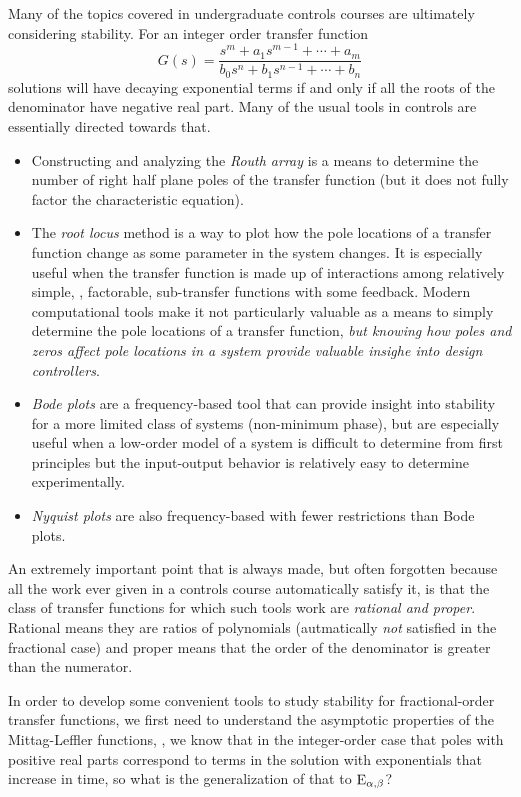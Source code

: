 Many of the topics covered in undergraduate controls courses are ultimately considering stability. For an integer order transfer function
\begin{equation*}
  G(s) = \frac{s^m + a_1 s^{m-1} + \cdots + a_m}{b_0 s^n + b_1 s^{n-1} + \cdots + b_n}
\end{equation*}
solutions will have decaying exponential terms if and only if all the roots of the denominator have negative real part. Many of the usual tools in controls are essentially directed towards that. 
\begin{itemize}
  \item Constructing and analyzing the \emph{Routh array} is a means to determine the number of right half plane poles of the transfer function (but it does not fully factor the characteristic equation).
  \item The \emph{root locus} method is a way to plot how the pole locations of a transfer function change as some parameter in the system changes. It is especially useful when the transfer function is made up of interactions among relatively simple, \ie, factorable, sub-transfer functions with some feedback. Modern computational tools make it not particularly valuable as a means to simply determine the pole locations of a transfer function, \emph{but knowing how poles and zeros affect pole locations in a system provide valuable insighe into design controllers}.
  \item \emph{Bode plots} are a frequency-based tool that can provide insight into stability for a more limited class of systems (non-minimum phase), but are especially useful when a low-order model of a system is difficult to determine from first principles but the input-output behavior is relatively easy to determine experimentally.
  \item \emph{Nyquist plots} are also frequency-based with fewer restrictions than Bode plots.
\end{itemize}
An extremely important point that is always made, but often forgotten because all the work ever given in a controls course automatically satisfy it, is that the class of transfer functions for which such tools work are \emph{rational and proper}. Rational means they are ratios of polynomials (autmatically \emph{not} satisfied in the fractional case) and proper means that the order of the denominator is greater than the numerator.

In order to develop some convenient tools to study stability for fractional-order transfer functions, we first need to understand the asymptotic properties of the Mittag-Leffler functions, \ie, we know that in the integer-order case that poles with positive real parts correspond to terms in the solution with exponentials that increase in time, so what is the generalization of that to $\operatorname{E}_{\alpha,\beta}$?

